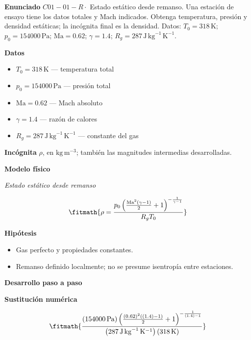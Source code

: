 \documentclass[10pt,openany]{book}
\begin{document}
\begin{tcolorbox}[title={Problema resuelto 1}, studiumworked, breakable]

\noindent\textbf{Enunciado}
\(C01-01-R \cdot\) Estado estático desde remanso. Una estación de ensayo tiene los datos totales y Mach indicados. Obtenga temperatura, presión y densidad estáticas; la incógnita final es la densidad. Datos: \(T_0=318\, \mathrm{K}\); \(p_0=154000\, \mathrm{Pa}\); \(\mathrm{Ma}=0.62\); \(\gamma=1.4\); \(R_g=287\, \mathrm{J}\,\mathrm{kg}^{-1}\,\mathrm{K}^{-1}\).

\noindent\textbf{Datos}
\begin{itemize}
\item $T_0 = 318\,\mathrm{K}$ — temperatura total
\item $p_0 = 154000\,\mathrm{Pa}$ — presión total
\item $\mathrm{Ma} = 0.62$ — Mach absoluto
\item $\gamma = 1.4$ — razón de calores
\item $R_g = 287\,\mathrm{J}\,\mathrm{kg}^{-1}\,\mathrm{K}^{-1}$ — constante del gas
\end{itemize}

\noindent\textbf{Incógnita}
$\rho$, en $\mathrm{kg\,m^{-3}}$; también las magnitudes intermedias desarrolladas.

\noindent\textbf{Modelo físico}

\noindent\textit{Estado estático desde remanso}

\[
\fitmath{\rho=\frac{p_0 \left(\frac{\mathrm{Ma}^{2} \left(\gamma - 1\right)}{2} + 1\right)^{- \frac{1}{\gamma - 1}}}{R_g T_0}}
\]

\noindent\textbf{Hipótesis}
\begin{itemize}
\item Gas perfecto y propiedades constantes.
\item Remanso definido localmente; no se presume isentropía entre estaciones.
\end{itemize}

\noindent\textbf{Desarrollo paso a paso}



\noindent\textbf{Sustitución numérica}

\[
\fitmath{\frac{\left(154000\,\mathrm{Pa}\right) \left(\frac{\left(0.62\right)^{2} \left(\left(1.4\right) - 1\right)}{2} + 1\right)^{- \frac{1}{\left(1.4\right) - 1}}}{\left(287\,\mathrm{J}\,\mathrm{kg}^{-1}\,\mathrm{K}^{-1}\right) \left(318\,\mathrm{K}\right)}}
\]


\end{tcolorbox}
\end{document}
